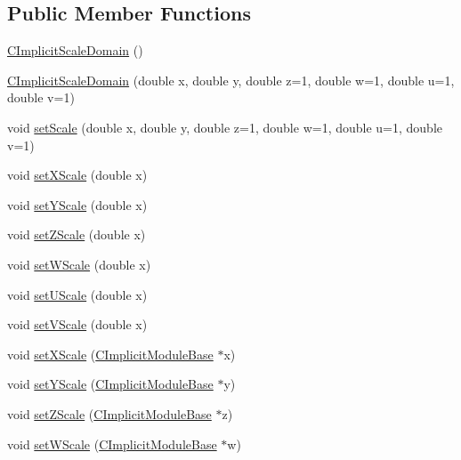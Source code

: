 \subsection*{Public Member Functions}
\begin{DoxyCompactItemize}
\item 
\hyperlink{classanl_1_1CImplicitScaleDomain_a1d894bf64f44a3b592c0dc9475b6016f}{CImplicitScaleDomain} ()
\item 
\hyperlink{classanl_1_1CImplicitScaleDomain_a9afc4b458c789129e223ec177d7b192f}{CImplicitScaleDomain} (double x, double y, double z=1, double w=1, double u=1, double v=1)
\item 
void \hyperlink{classanl_1_1CImplicitScaleDomain_ab957f69850416981a627ee621b8a5e60}{setScale} (double x, double y, double z=1, double w=1, double u=1, double v=1)
\item 
void \hyperlink{classanl_1_1CImplicitScaleDomain_ad009671387e9386b3e79614e9fea2a1a}{setXScale} (double x)
\item 
void \hyperlink{classanl_1_1CImplicitScaleDomain_a6322ef1b6d26e656fcf0808a4ff07197}{setYScale} (double x)
\item 
void \hyperlink{classanl_1_1CImplicitScaleDomain_a6df7caf2ba1f5f8e30e57c17dffda2dd}{setZScale} (double x)
\item 
void \hyperlink{classanl_1_1CImplicitScaleDomain_ae5210707bac75f3c1efdf49c1e758be9}{setWScale} (double x)
\item 
void \hyperlink{classanl_1_1CImplicitScaleDomain_a5eb1f857aad4862dfcacc407b74e12ef}{setUScale} (double x)
\item 
void \hyperlink{classanl_1_1CImplicitScaleDomain_a56f4c93516183688e5aced056e89afe6}{setVScale} (double x)
\item 
void \hyperlink{classanl_1_1CImplicitScaleDomain_a9b9f220cb9dfda7ccda23b40e506d0d6}{setXScale} (\hyperlink{classanl_1_1CImplicitModuleBase}{CImplicitModuleBase} $\ast$x)
\item 
void \hyperlink{classanl_1_1CImplicitScaleDomain_af50b869f0dd05e63fca5643d068c2230}{setYScale} (\hyperlink{classanl_1_1CImplicitModuleBase}{CImplicitModuleBase} $\ast$y)
\item 
void \hyperlink{classanl_1_1CImplicitScaleDomain_a8ab377fd0f03119a9bbd9d399d0721d7}{setZScale} (\hyperlink{classanl_1_1CImplicitModuleBase}{CImplicitModuleBase} $\ast$z)
\item 
void \hyperlink{classanl_1_1CImplicitScaleDomain_ad8f6ef9b637a7e58520a5d861fee258a}{setWScale} (\hyperlink{classanl_1_1CImplicitModuleBase}{CImplicitModuleBase} $\ast$w)

\end{DoxyCompactItemize}
